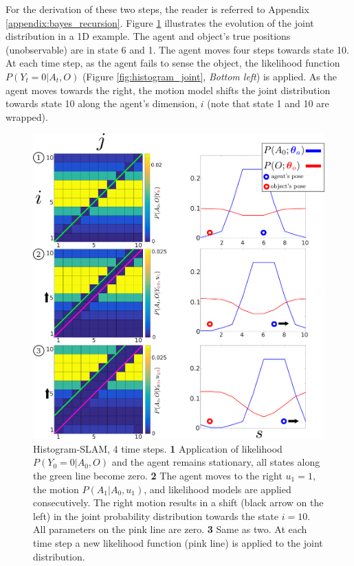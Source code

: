 For the derivation of these  two steps, the reader is referred to Appendix \ref{appendix:bayes_recursion}.
Figure \ref{fig:discrete_example} illustrates the evolution of the joint distribution in a 1D example. 
The agent and object's true positions (unobservable) are in state 6 and 1. The agent moves four steps towards state 10. At each time 
step, as the agent fails to sense the object, the likelihood function  $P(Y_t=0|A_t,O)$ (Figure \ref{fig:histogram_joint}, \textit{Bottom left})
is applied. As the agent moves towards the right, the motion model shifts the joint distribution towards state 10 along the agent's 
dimension, $i$ (note that state 1 and 10 are wrapped).

\begin{figure}
 \centering
  \includegraphics[width=\textwidth]{./ch5-MLMF/Figures/explenation/Figure5.pdf}
  \caption{Histogram-SLAM, 4 time steps. \textbf{1} Application of likelihood $P(Y_0=0|A_0,O)$ and the agent remains stationary, all states along the green line become zero.
  \textbf{2} The agent moves to the right $u_1=1$, the motion $P(A_1|A_0,u_1)$, and likelihood models are applied consecutively. The right motion results in a shift 
   (black arrow on the left) in the joint probability distribution towards the state $i=10$. All parameters on the pink line are zero. \textbf{3} Same as two. 
   At each time step a new likelihood function (pink line) is applied to the joint distribution.}
  \label{fig:discrete_example}
\end{figure}

